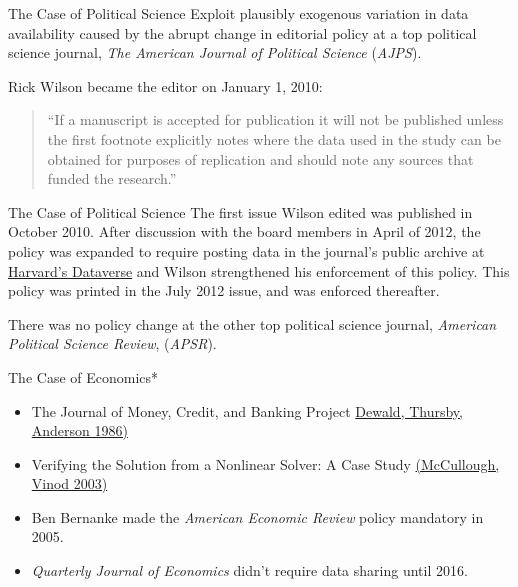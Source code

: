 \documentclass{beamer}
\begin{document}
\begin{frame}{The Case of Political Science}
Exploit plausibly exogenous variation in data availability caused by the abrupt change in editorial policy at a top political science journal, \textit{The American Journal of Political Science} (\textit{AJPS}). 

Rick Wilson became the editor on January 1, 2010:
\begin{quote} ``If a manuscript is accepted for publication it will not be published unless the first footnote explicitly notes where the data used in the study can be obtained for purposes of replication and should note any sources that funded the research.''
\end{quote}
\end{frame}

\begin{frame}{The Case of Political Science}
The first issue Wilson edited was published in October 2010. After discussion with the board members in April of 2012, the policy was expanded to require posting data in the journal's public archive at \href{https://thedata.harvard.edu/dvn/dv/ajps}{Harvard's Dataverse} and Wilson strengthened his enforcement of this policy. This policy was printed in the July 2012 issue, and was enforced thereafter.
\vspace{0.25in}

There was no policy change at the other top political science journal, \textit{American Political Science Review}, (\textit{APSR}).
\end{frame}

\begin{frame}{The Case of Economics*}
\begin{itemize}
\item The Journal of Money, Credit, and Banking Project \href{http://www.jstor.org/stable/3132121}{Dewald, Thursby, Anderson 1986)}
\item Verifying the Solution from a Nonlinear Solver: A Case Study \href{http://www.jstor.org/stable/3132121}{(McCullough, Vinod 2003)}
\item Ben Bernanke made the \textit{American Economic Review} policy mandatory in 2005.
\item \textit{Quarterly Journal of Economics} didn't require data sharing until 2016.
\end{itemize}
\end{frame}
\end{document}
